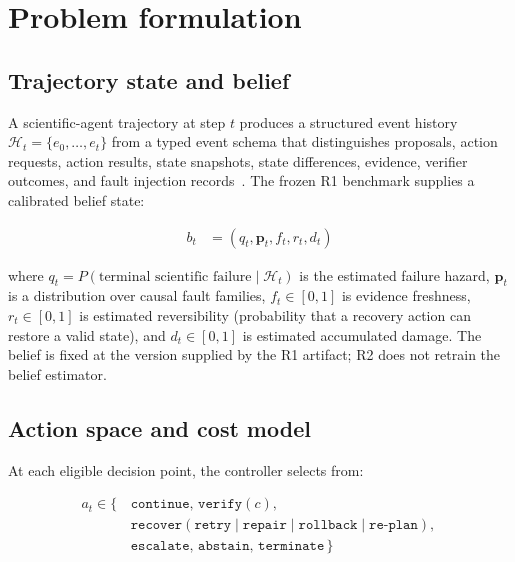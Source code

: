 \section{Problem formulation}
\label{sec:problem}

\subsection{Trajectory state and belief}

A scientific-agent trajectory at step $t$ produces a structured event
history $\mathcal{H}_t = \{e_0, \dots, e_t\}$ from a typed event schema
that distinguishes proposals, action requests, action results, state
snapshots, state differences, evidence, verifier outcomes, and fault
injection records~\citep{reliability_benchmark}. The frozen R1 benchmark supplies a
calibrated belief state:

\begin{align}
    b_t &= (q_t, \mathbf{p}_t, f_t, r_t, d_t) \label{eq:belief}
\end{align}

where $q_t = P(\text{terminal scientific failure} \mid \mathcal{H}_t)$ is
the estimated failure hazard, $\mathbf{p}_t$ is a distribution over causal
fault families, $f_t \in [0,1]$ is evidence freshness, $r_t \in [0,1]$ is
estimated reversibility (probability that a recovery action can restore a
valid state), and $d_t \in [0,1]$ is estimated accumulated damage. The
belief is fixed at the version supplied by the R1 artifact; R2 does not
retrain the belief estimator.

\subsection{Action space and cost model}

At each eligible decision point, the controller selects from:

\begin{align}
    a_t \in \{\, &\texttt{continue},\,
                 \texttt{verify}(c),\,\nonumber\\
                 &\texttt{recover}(\texttt{retry} \mid \texttt{repair} \mid
                                   \texttt{rollback} \mid \texttt{re-plan}),\,\nonumber\\
                 &\texttt{escalate},\,
                 \texttt{abstain},\,
                 \texttt{terminate} \,\} \label{eq:actions}
\end{align}

